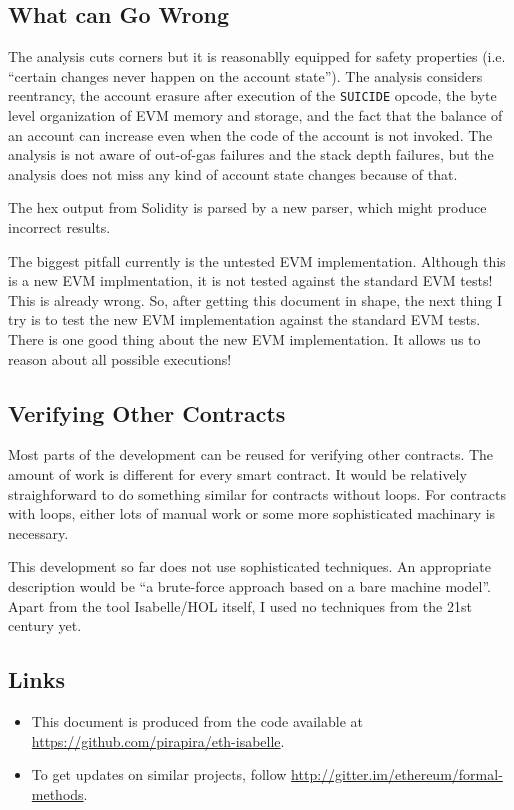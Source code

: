 \documentclass[11pt,a4paper]{article}
\begin{document}
\subsection{What can Go Wrong}

The analysis cuts corners but it is reasonablly equipped for safety
properties (i.e. ``certain changes never happen on the account
state'').  The analysis considers reentrancy, the account erasure after execution
of the \texttt{SUICIDE} opcode, the byte level organization of EVM
memory and storage, and the fact that the balance of an account can
increase even when the code of the account is not invoked.
The analysis is not aware of out-of-gas failures and the stack depth
failures, but the analysis does not miss any kind of account state
changes because of that.

The hex output from Solidity is parsed by a new parser, which might produce incorrect results.

The biggest pitfall currently is the untested EVM implementation.
Although this is a new EVM implmentation, it is not
tested against the standard EVM tests!  This is already wrong.
So, after getting this document in shape, the next thing I try is to
test the new EVM implementation against the standard EVM tests.
There is one good thing about the new EVM implementation. It allows us to reason about all possible executions!

\subsection{Verifying Other Contracts}

Most parts of the development can be reused for verifying other contracts.
The amount of work is
different for every smart contract.  It would be relatively
straighforward to do something similar for
contracts without loops.  For contracts with loops,
either lots of manual work or some more
sophisticated machinary is necessary.

This development so far does not use sophisticated techniques.
An appropriate description would be ``a brute-force approach based on a bare machine model''.
Apart from the tool Isabelle/HOL itself, I used no techniques from the 21st century yet.

\subsection{Links}

\begin{itemize}
\item This document is produced from the code available at
\url{https://github.com/pirapira/eth-isabelle}.
\item To get updates on similar projects, follow \url{http://gitter.im/ethereum/formal-methods}.
\end{itemize}



%
%
\end{document}
